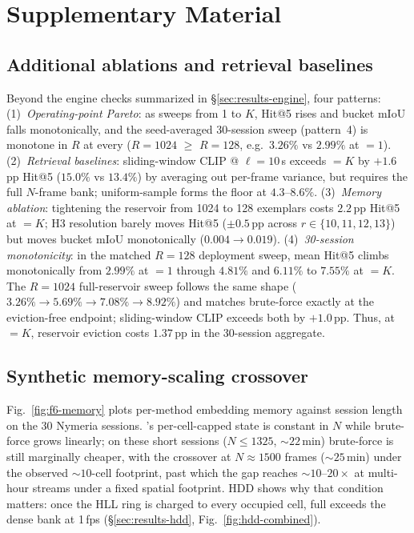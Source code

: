 
\section{Supplementary Material}
\label{sec:supp}

\subsection{Additional ablations and retrieval baselines}
\label{sec:supp-ablations}

Beyond the engine checks summarized in \S\ref{sec:results-engine}, four patterns:
(1)~\emph{Operating-point Pareto}: as \caponek{} sweeps from 1 to $K$, Hit@5 rises and bucket mIoU falls monotonically, and the seed-averaged 30-session sweep (pattern~4) is monotone in $R$ at every \caponek{} ($R{=}1024$ $\geq$ $R{=}128$, e.g.\ $3.26\%$ vs $2.99\%$ at \caponek{}$=1$).
(2)~\emph{Retrieval baselines}: sliding-window CLIP @ $\ell{=}10$\,s exceeds \psm{} \caponek{}$=K$ by $+1.6$\,pp Hit@5 ($15.0\%$ vs $13.4\%$) by averaging out per-frame variance, but requires the full $N$-frame bank; uniform-sample forms the floor at $4.3$--$8.6\%$.
(3)~\emph{Memory ablation}: tightening the reservoir from 1024 to 128 exemplars costs $2.2$\,pp Hit@5 at \caponek{}$=K$; H3 resolution barely moves Hit@5 (${\pm}0.5$\,pp across $r \in \{10,11,12,13\}$) but moves bucket mIoU monotonically ($0.004 \to 0.019$).
(4)~\emph{30-session monotonicity}: in the matched $R{=}128$ deployment sweep, mean Hit@5 climbs monotonically from $2.99\%$ at \caponek{}$=1$ through $4.81\%$ and $6.11\%$ to $7.55\%$ at \caponek{}$=K$. The $R{=}1024$ full-reservoir sweep follows the same shape ($3.26\% \to 5.69\% \to 7.08\% \to 8.92\%$) and matches brute-force exactly at the eviction-free endpoint; sliding-window CLIP exceeds both by $+1.0$\,pp. Thus, at \caponek{}$=K$, reservoir eviction costs $1.37$\,pp in the 30-session aggregate.

\subsection{Synthetic memory-scaling crossover}
\label{sec:supp-memory}
Fig.~\ref{fig:f6-memory} plots per-method embedding memory against session length
on the 30 Nymeria sessions. \psm{}'s per-cell-capped state is constant in $N$
while brute-force grows linearly; on these short sessions ($N{\le}1325$,
${\sim}22$\,min) brute-force is still marginally cheaper, with the crossover at
$N\approx1500$ frames (${\sim}25$\,min) under the observed ${\sim}10$-cell
footprint, past which the gap reaches ${\sim}10$--$20\times$ at multi-hour
streams under a fixed spatial footprint. HDD shows why that condition matters:
once the HLL ring is charged to every occupied cell, full \psm{} exceeds the
dense bank at 1\,fps (\S\ref{sec:results-hdd}, Fig.~\ref{fig:hdd-combined}).

